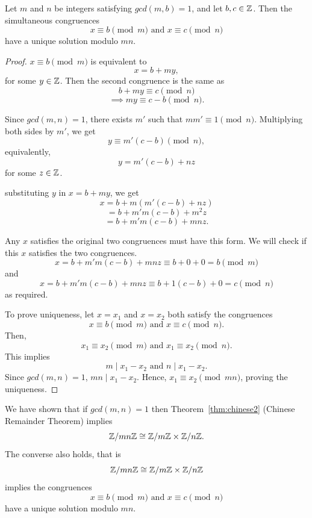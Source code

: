 \begin{theorem}\label{thm:chinese2}
    Let $m$ and $n$ be integers satisfying $gcd(m,b) = 1$, and let $b,c \in \mathbb{Z}$. Then the simultaneous congruences \[x \equiv b \pmod{m} \text{ and } x \equiv c \pmod{n}\] have a unique solution modulo $mn$.
\end{theorem}
\begin{proof}
    $x \equiv b \pmod{m}$ is equivalent to \[x = b + my,\] for some $y \in \mathbb{Z}$. Then the second congruence is the same as \[b + my \equiv c \pmod{n}\]\[\implies my \equiv c - b \pmod{n}.\]

    Since $gcd(m,n) = 1$, there exists $m'$ such that $mm' \equiv 1 \pmod{n}$. Multiplying both sides by $m'$, we get \[y \equiv m'(c-b) \pmod{n},\] equivalently, \[y = m'(c-b) + nz\] for some $z \in \mathbb{Z}$.

    substituting $y$ in $x = b + my$, we get \[x = b + m(m'(c-b) + nz)\] \[= b + m'm(c-b) + m^2z\] \[= b + m'm(c-b) + mnz.\]

    Any $x$ satisfies the original two congruences must have this form. We will check if this $x$ satisfies the two congruences. \[x = b + m'm(c-b) + mnz \equiv b + 0 + 0 = b \pmod{m}\] and \[x = b + m'm(c-b) + mnz \equiv b + 1(c-b) + 0 = c \pmod{n}\] as required.

    To prove uniqueness, let $x= x_1$ and $x = x_2$ both satisfy the congruences \[x \equiv b \pmod{m} \text{ and } x \equiv c \pmod{n}.\] Then, \[x_1 \equiv x_2 \pmod{m} \text{ and } x_1 \equiv x_2 \pmod{n}.\] This implies \[m \mid x_1 - x_2 \text{ and } n \mid x_1 - x_2.\] Since $gcd(m,n) = 1$, $mn \mid x_1 - x_2$. Hence, $x_1 \equiv x_2 \pmod{mn}$, proving the uniqueness.
\end{proof}
\begin{remark}
    We have shown that if $gcd(m,n)=1$ then Theorem~\ref{thm:chinese2} (Chinese Remainder Theorem) implies \[\mathbb{Z}/mn\mathbb{Z} \cong \mathbb{Z}/m\mathbb{Z} \times \mathbb{Z}/n\mathbb{Z}.\] The converse also holds, that is \[\mathbb{Z}/mn\mathbb{Z} \cong \mathbb{Z}/m\mathbb{Z} \times \mathbb{Z}/n\mathbb{Z}\] implies the congruences \[x \equiv b \pmod{m} \text{ and } x \equiv c \pmod{n}\] have a unique solution modulo $mn$.
\end{remark}

